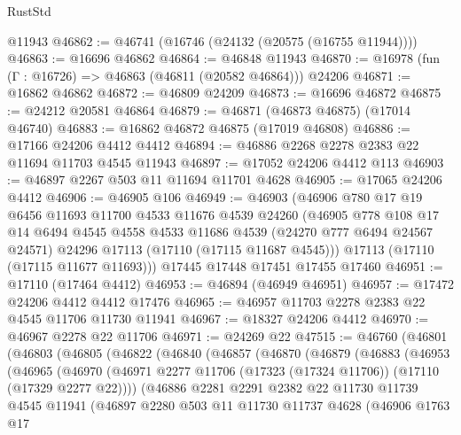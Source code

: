 \begin{lexlean}{RustStd}
\begin{coremodule}
    @11943
@46862 := @46741 (@16746 (@24132 (@20575 (@16755 @11944))))
@46863 := @16696 @46862
@46864 := @46848 @11943
@46870 := @16978 (fun (Γ : @16726) => @46863 (@46811 (@20582 @46864))) @24206
@46871 := @16862 @46862
@46872 := @46809 @24209
@46873 := @16696 @46872
@46875 := @24212 @20581 @46864
@46879 := @46871 (@46873 @46875) (@17014 @46740)
@46883 := @16862 @46872 @46875 (@17019 @46808)
@46886 := @17166 @24206 @4412 @4412
@46894 := @46886 @2268 @2278 @2383 @22 @11694 @11703 @4545 @11943
@46897 := @17052 @24206 @4412 @113
@46903 := @46897 @2267 @503 @11 @11694 @11701 @4628
@46905 := @17065 @24206 @4412
@46906 := @46905 @106
@46949 := @46903
    (@46906
      @780
      @17
      @19
      @6456
      @11693
      @11700
      @4533
      @11676
      @4539
      @24260
      (@46905
        @778
        @108
        @17
        @14
        @6494
        @4545
        @4558
        @4533
        @11686
        @4539
        (@24270 @777 @6494 @24567 @24571)
        @24296
        @17113
        (@17110 (@17115 @11687 @4545)))
      @17113
      (@17110 (@17115 @11677 @11693)))
    @17445
    @17448
    @17451
    @17455
    @17460
@46951 := @17110 (@17464 @4412)
@46953 := @46894 (@46949 @46951)
@46957 := @17472 @24206 @4412 @4412 @17476
@46965 := @46957 @11703 @2278 @2383 @22 @4545 @11706 @11730 @11941
@46967 := @18327 @24206 @4412
@46970 := @46967 @2278 @22 @11706
@46971 := @24269 @22
@47515 := @46760
    (@46801
      (@46803
        (@46805
          (@46822
            (@46840
              (@46857
                (@46870
                  (@46879
                    (@46883
                      (@46953
                        (@46965
                          (@46970
                            (@46971
                              @2277
                              @11706
                              (@17323 (@17324 @11706))
                              (@17110 (@17329 @2277 @22))))
                          (@46886
                            @2281
                            @2291
                            @2382
                            @22
                            @11730
                            @11739
                            @4545
                            @11941
                            (@46897
                              @2280
                              @503
                              @11
                              @11730
                              @11737
                              @4628
                              (@46906
                                @1763
                                @17

\end{coremodule}
\end{lexlean}

